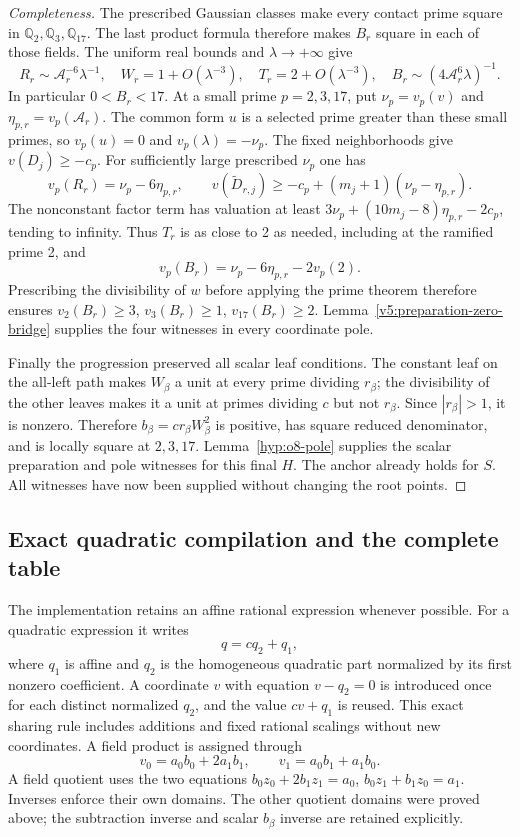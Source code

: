 \documentclass[11pt]{article}
\theoremstyle{definition}
\theoremstyle{remark}
\newcommand{\Q}{\mathbb Q}
\begin{document}
\begin{proof}[Completeness]
The prescribed Gaussian classes make every contact prime square
in $\Q_2,\Q_3,\Q_{17}$. The last product formula therefore makes
$B_r$ square in each of those fields. The uniform real bounds
and $\lambda\longrightarrow+\infty$ give
\[
 R_r\sim\mathcal A_r^{-6}\lambda^{-1},\quad
 W_r=1+O(\lambda^{-3}),\quad T_r=2+O(\lambda^{-3}),\quad
 B_r\sim(4\mathcal A_r^6\lambda)^{-1}.
\]
In particular $0<B_r<17$. At a small prime $p=2,3,17$, put
$\nu_p=v_p(v)$ and $\eta_{p,r}=v_p(\mathcal A_r)$.
The common form $u$ is a selected prime greater than these small
primes, so $v_p(u)=0$ and $v_p(\lambda)=-\nu_p$.
The fixed neighborhoods give $v(D_j)\ge-c_p$. For sufficiently
large prescribed $\nu_p$ one has
\[
 v_p(R_r)=\nu_p-6\eta_{p,r},\qquad
 v(\widetilde D_{r,j})\ge-c_p+(m_j+1)(\nu_p-\eta_{p,r}).
\]
The nonconstant factor term has valuation at least
$3\nu_p+(10m_j-8)\eta_{p,r}-2c_p$, tending to infinity.
Thus $T_r$ is as close to 2 as needed, including at the ramified
prime 2, and
\[
 v_p(B_r)=\nu_p-6\eta_{p,r}-2v_p(2).
\]
Prescribing the divisibility of $w$ before applying the prime theorem
therefore ensures $v_2(B_r)\ge3$, $v_3(B_r)\ge1$,
$v_{17}(B_r)\ge2$. Lemma~\ref{v5:preparation-zero-bridge} supplies
the four witnesses in every coordinate pole.

Finally the progression preserved all scalar leaf conditions.
The constant leaf on the all-left path makes $W_\beta$ a unit at
every prime dividing $r_\beta$; the divisibility of the other
leaves makes it a unit at primes dividing $c$ but not $r_\beta$.
Since $|r_\beta|>1$, it is nonzero. Therefore
$b_\beta=cr_\beta W_\beta^2$ is positive, has square reduced
denominator, and is locally square at $2,3,17$.
Lemma~\ref{hyp:o8-pole} supplies the scalar preparation and pole
witnesses for this final $H$. The anchor already holds for $S$.
All witnesses have now been supplied without changing the root points.
\end{proof}

\subsection{Exact quadratic compilation and the complete table}
\label{subsec:v5-compilation}

The implementation retains an affine rational expression whenever
possible. For a quadratic expression it writes
\[
 q=cq_2+q_1,
\]
where $q_1$ is affine and $q_2$ is the homogeneous quadratic part
normalized by its first nonzero coefficient. A coordinate $v$
with equation $v-q_2=0$ is introduced once for each distinct
normalized $q_2$, and the value $cv+q_1$ is reused. This exact
sharing rule includes additions and fixed rational scalings without
new coordinates. A field product is assigned through
\[
 v_0=a_0b_0+2a_1b_1,\qquad v_1=a_0b_1+a_1b_0.
\]
A field quotient uses the two equations
$b_0z_0+2b_1z_1=a_0$, $b_0z_1+b_1z_0=a_1$.
Inverses enforce their own domains. The other quotient domains
were proved above; the subtraction inverse and scalar $b_\beta$
inverse are retained explicitly.
\end{document}
